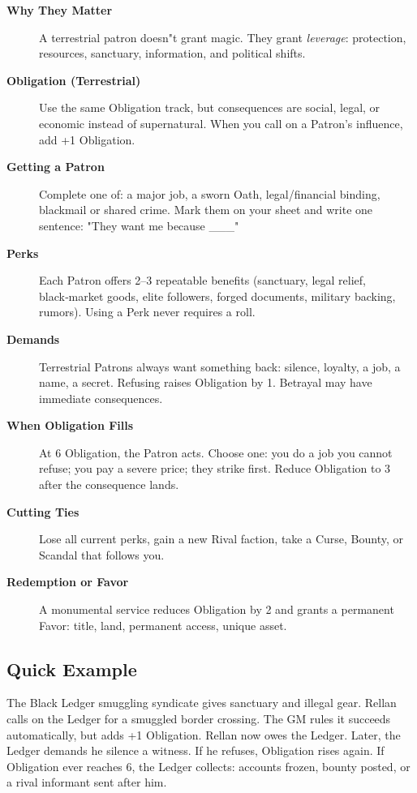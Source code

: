 \begin{description}
    \item[\textbf{Why They Matter}] A terrestrial patron doesn"t grant magic. They grant \emph{leverage}: protection, resources, sanctuary, information, and political shifts.
    \item[\textbf{Obligation (Terrestrial)}] Use the same Obligation track, but consequences are social, legal, or economic instead of supernatural. When you call on a Patron's influence, add +1 Obligation.
    \item[\textbf{Getting a Patron}] Complete one of: a major job, a sworn Oath, legal/financial binding, blackmail or shared crime. Mark them on your sheet and write one sentence: "They want me because \_\_\_"
    \item[\textbf{Perks}] Each Patron offers 2--3 repeatable benefits (sanctuary, legal relief, black‑market goods, elite followers, forged documents, military backing, rumors). Using a Perk never requires a roll.
    \item[\textbf{Demands}] Terrestrial Patrons always want something back: silence, loyalty, a job, a name, a secret. Refusing raises Obligation by 1. Betrayal may have immediate consequences.
    \item[\textbf{When Obligation Fills}] At 6 Obligation, the Patron acts. Choose one: you do a job you cannot refuse; you pay a severe price; they strike first. Reduce Obligation to 3 after the consequence lands.
    \item[\textbf{Cutting Ties}] Lose all current perks, gain a new Rival faction, take a Curse, Bounty, or Scandal that follows you.
    \item[\textbf{Redemption or Favor}] A monumental service reduces Obligation by 2 and grants a permanent Favor: title, land, permanent access, unique asset.
\end{description}

\subsection*{Quick Example}
The Black Ledger smuggling syndicate gives sanctuary and illegal gear. Rellan calls on the Ledger for a smuggled border crossing. The GM rules it succeeds automatically, but adds +1 Obligation. Rellan now owes the Ledger. Later, the Ledger demands he silence a witness. If he refuses, Obligation rises again. If Obligation ever reaches 6, the Ledger collects: accounts frozen, bounty posted, or a rival informant sent after him.

